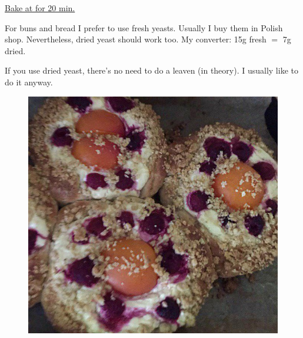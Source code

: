 \begin{recipe}
{        \step \underline{Bake at \unit[180]{\textcelcius} for 20 min.}
        \vspace{2cm}
    }

    \suggestion
    {%
        For buns and bread I prefer to use fresh yeasts.
        Usually I buy them in Polish shop.
        Nevertheless, dried yeast should work too.
        My converter: 15g fresh $=$ 7g dried.

        If you use dried yeast, there's no need to do a leaven (in theory).
        I usually like to do it anyway.

        \begin{figure}[h]
            \centering
              \centering
              \includegraphics[width=12cm]{pic/buns_apricot_quark}
        \end{figure}
    }


\end{recipe}
